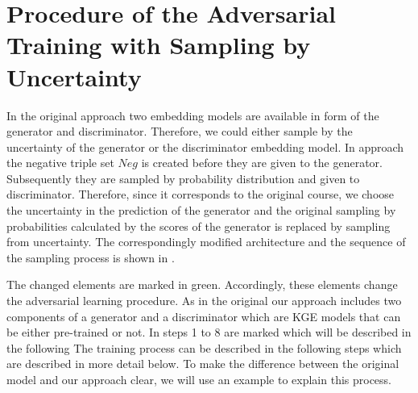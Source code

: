 \section{Procedure of the Adversarial Training with Sampling by Uncertainty}
\label{sec:procedure}

In the original \kbgan approach two embedding models are available in form of the generator and discriminator.
Therefore, we could either sample by the uncertainty of the generator or the discriminator embedding model.
In \kbgan approach the negative triple set $Neg$ is created before they are given to the generator.
Subsequently they are sampled by probability distribution and given to discriminator.
Therefore, since it corresponds to the original course, we choose the uncertainty in the prediction of the generator and the original sampling by probabilities calculated by the scores of the generator is replaced by sampling from uncertainty.
The correspondingly modified architecture and the sequence of the sampling process is shown in .

The changed elements are marked in green.
Accordingly, these elements change the adversarial learning procedure.
As in the original \kbgan our approach includes two components of a generator and a discriminator which are \ac{KGE} models that can be either pre-trained or not.
In  steps 1 to 8 are marked which will be described in the following 
The training process can be described in the following steps
which are described in more detail below.
To make the difference between the original model and our approach clear, we will use an example to explain this process.
















